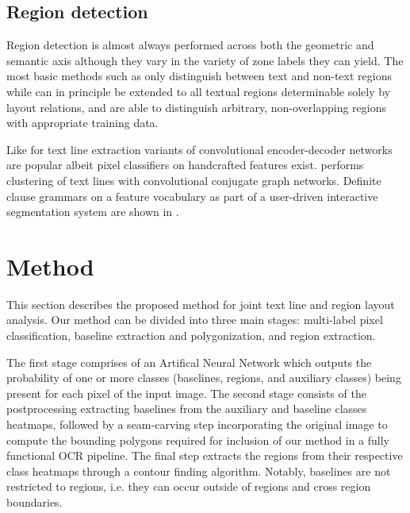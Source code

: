 \subsection{Region detection}

Region detection is almost always performed across both the geometric and
semantic axis although they vary in the variety of zone labels they can
yield. The most basic methods such as \cite{baechler2011multi,
chen2014page} only distinguish between text and non-text regions while
\cite{dejean2019versatile} can in principle be extended to all textual regions
determinable solely by layout relations, and \cite{soullard2020multi,
quiros2018multi, oliveira2018dhsegment, kaddas2018deep} are able to distinguish
arbitrary, non-overlapping regions with appropriate training data.

Like for text line extraction \cite{soullard2020multi,quiros2018multi,
oliveira2018dhsegment} variants of convolutional
encoder-decoder networks are popular albeit pixel classifiers on handcrafted
features \cite{chen2014page, baechler2011multi} exist.
\cite{dejean2019versatile} performs clustering of text lines with convolutional
conjugate graph networks.  Definite clause grammars on a feature vocabulary as
part of a user-driven interactive segmentation system are shown in
\cite{lemaitre2008multiresolution}.

\section{Method}

This section describes the proposed method for joint text line and region
layout analysis. Our method can be divided into three main stages: multi-label
pixel classification, baseline extraction and polygonization, and region
extraction.

The first stage comprises of an Artifical Neural Network which outputs the
probability of one or more classes (baselines, regions, and auxiliary classes)
being present for each pixel of the input image. The second stage consists of
the postprocessing extracting baselines from the auxiliary and baseline classes
heatmaps, followed by a seam-carving step incorporating the original image to
compute the bounding polygons required for inclusion of our method in a fully
functional OCR pipeline.  The final step extracts the regions from their
respective class heatmaps through a contour finding algorithm. Notably,
baselines are not restricted to regions, i.e. they can occur outside of regions
and cross region boundaries. 

